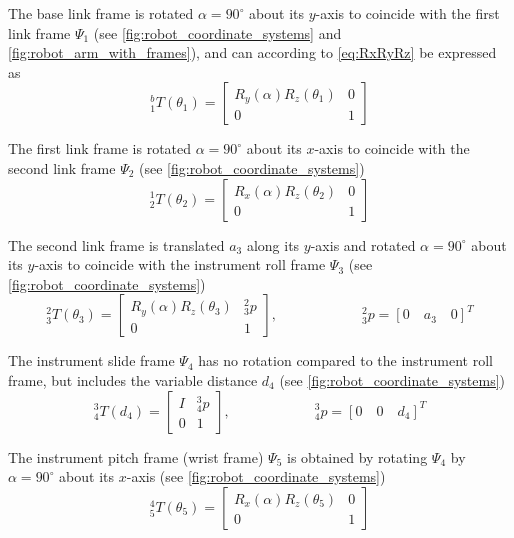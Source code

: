 The base link frame is rotated $\alpha=90^\circ$ about its $y$-axis to coincide with the first link frame $\Psi_1$ (see \autoref{fig:robot_coordinate_systems} and \ref{fig:robot_arm_with_frames}), and can according to \autoref{eq:RxRyRz} be expressed as
\begin{equation}
^b_1 T(\theta_1) = 
\begin{bmatrix}
R_y(\alpha) R_z(\theta_1) & 0\\
0 & 1
\end{bmatrix}
\end{equation}

The first link frame is rotated $\alpha=90^\circ$ about its $x$-axis to coincide with the second link frame $\Psi_2$ (see \autoref{fig:robot_coordinate_systems})
\begin{equation}
^1_2 T(\theta_2) = 
\begin{bmatrix}
R_x(\alpha) R_z(\theta_2) & 0\\
0 & 1
\end{bmatrix} 
\end{equation}

The second link frame is translated $a_3$ along its $y$-axis and rotated $\alpha=90^\circ$ about its $y$-axis to coincide with the instrument roll frame $\Psi_3$ (see \autoref{fig:robot_coordinate_systems})
\begin{equation}
^2_3 T(\theta_3) = 
\begin{bmatrix}
R_y(\alpha)R_z(\theta_3) & ^2_3p\\
0 & 1
\end{bmatrix}, 
\qquad\qquad\qquad
^2_3p = [0 \quad a_3 \quad 0]^T
\end{equation}

The instrument slide frame $\Psi_4$ has no rotation compared to the instrument roll frame, but includes the variable distance $d_4$ (see \autoref{fig:robot_coordinate_systems})
\begin{equation}
^3_4 T(d_4) = 
\begin{bmatrix}
I & ^3_4p\\
0 & 1
\end{bmatrix}, 
\qquad\qquad\qquad
^3_4p = [0 \quad 0 \quad d_4]^T
\end{equation}

The instrument pitch frame (wrist frame) $\Psi_5$ is obtained by rotating $\Psi_4$ by $\alpha=90^\circ$ about its $x$-axis (see \autoref{fig:robot_coordinate_systems})
\begin{equation}
^4_5 T(\theta_5) = 
\begin{bmatrix}
R_x(\alpha)R_z(\theta_5) & 0\\
0 & 1
\end{bmatrix}
\end{equation}

